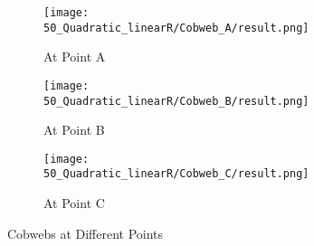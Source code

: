 \begin{figure}
    \centering
    \begin{subfigure}{0.3\textwidth}
        \centering
        \texttt{[image: 50\_Quadratic\_linearR/Cobweb\_A/result.png]}
        \caption{At Point A}
        \label{fig:quad.full.fit.lin.CobwebA}
    \end{subfigure}
    \begin{subfigure}{0.3\textwidth}
        \centering
        \texttt{[image: 50\_Quadratic\_linearR/Cobweb\_B/result.png]}
        \caption{At Point B}
        \label{fig:quad.full.fit.lin.CobwebB}
    \end{subfigure}
    \begin{subfigure}{0.3\textwidth}
        \centering
        \texttt{[image: 50\_Quadratic\_linearR/Cobweb\_C/result.png]}
        \caption{At Point C}
        \label{fig:quad.full.fit.lin.CobwebC}
    \end{subfigure}
    \caption{Cobwebs at Different Points}
    \label{fig:quad.full.fit.lin.Cobwebs}
\end{figure}


